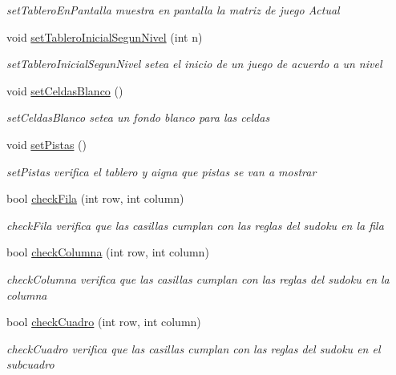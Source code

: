 \begin{DoxyCompactItemize}
\begin{DoxyCompactList}\small\item\em set\-Tablero\-En\-Pantalla muestra en pantalla la matriz de juego Actual \end{DoxyCompactList}\item 
void \hyperlink{class_main_table_a548e2e9d049dd5088bb51b49023c8e5f}{set\-Tablero\-Inicial\-Segun\-Nivel} (int n)
\begin{DoxyCompactList}\small\item\em set\-Tablero\-Inicial\-Segun\-Nivel setea el inicio de un juego de acuerdo a un nivel \end{DoxyCompactList}\item 
\hypertarget{class_main_table_ac84930e6f165419f7895dedfb05c9156}{void \hyperlink{class_main_table_ac84930e6f165419f7895dedfb05c9156}{set\-Celdas\-Blanco} ()}\label{class_main_table_ac84930e6f165419f7895dedfb05c9156}

\begin{DoxyCompactList}\small\item\em set\-Celdas\-Blanco setea un fondo blanco para las celdas \end{DoxyCompactList}\item 
\hypertarget{class_main_table_a892e7117f4988c0eb58bab5f5901ef09}{void \hyperlink{class_main_table_a892e7117f4988c0eb58bab5f5901ef09}{set\-Pistas} ()}\label{class_main_table_a892e7117f4988c0eb58bab5f5901ef09}

\begin{DoxyCompactList}\small\item\em set\-Pistas verifica el tablero y aigna que pistas se van a mostrar \end{DoxyCompactList}\item 
bool \hyperlink{class_main_table_a0a735a29e6dd362c76720243f7079234}{check\-Fila} (int row, int column)
\begin{DoxyCompactList}\small\item\em check\-Fila verifica que las casillas cumplan con las reglas del sudoku en la fila \end{DoxyCompactList}\item 
bool \hyperlink{class_main_table_a1f4691add57adfe5f9b64ded9753802d}{check\-Columna} (int row, int column)
\begin{DoxyCompactList}\small\item\em check\-Columna verifica que las casillas cumplan con las reglas del sudoku en la columna \end{DoxyCompactList}\item 
bool \hyperlink{class_main_table_a0c8d0356ed30eef86ede365835d4683e}{check\-Cuadro} (int row, int column)
\begin{DoxyCompactList}\small\item\em check\-Cuadro verifica que las casillas cumplan con las reglas del sudoku en el subcuadro \end{DoxyCompactList}\end{DoxyCompactItemize}
